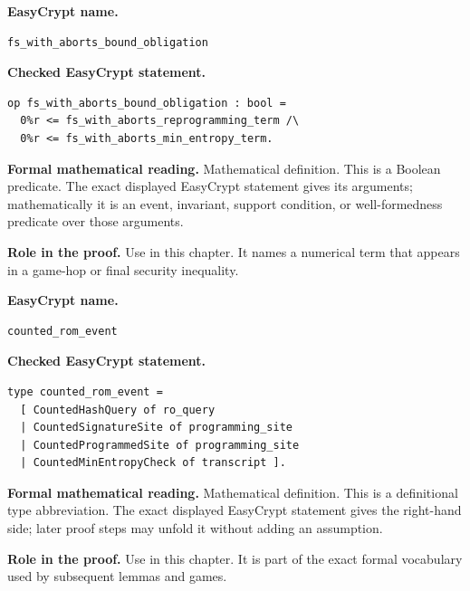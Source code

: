 \begin{formaldefinition}
\noindent\textbf{EasyCrypt name.}
\begin{lstlisting}[language=EasyCrypt,basicstyle=\ttfamily\scriptsize]
fs_with_aborts_bound_obligation
\end{lstlisting}
\noindent\textbf{Checked EasyCrypt statement.}
\begin{lstlisting}[language=EasyCrypt,basicstyle=\ttfamily\scriptsize]
op fs_with_aborts_bound_obligation : bool =
  0%r <= fs_with_aborts_reprogramming_term /\
  0%r <= fs_with_aborts_min_entropy_term.
\end{lstlisting}
\noindent\textbf{Formal mathematical reading.}
Mathematical definition. This is a Boolean predicate.  The exact displayed EasyCrypt statement gives its arguments; mathematically it is an event, invariant, support condition, or well-formedness predicate over those arguments.

\noindent\textbf{Role in the proof.}
Use in this chapter. It names a numerical term that appears in a game-hop or final security inequality.

\end{formaldefinition}

\begin{formaldefinition}
\noindent\textbf{EasyCrypt name.}
\begin{lstlisting}[language=EasyCrypt,basicstyle=\ttfamily\scriptsize]
counted_rom_event
\end{lstlisting}
\noindent\textbf{Checked EasyCrypt statement.}
\begin{lstlisting}[language=EasyCrypt,basicstyle=\ttfamily\scriptsize]
type counted_rom_event =
  [ CountedHashQuery of ro_query
  | CountedSignatureSite of programming_site
  | CountedProgrammedSite of programming_site
  | CountedMinEntropyCheck of transcript ].
\end{lstlisting}
\noindent\textbf{Formal mathematical reading.}
Mathematical definition. This is a definitional type abbreviation.  The exact displayed EasyCrypt statement gives the right-hand side; later proof steps may unfold it without adding an assumption.

\noindent\textbf{Role in the proof.}
Use in this chapter. It is part of the exact formal vocabulary used by subsequent lemmas and games.

\end{formaldefinition}

